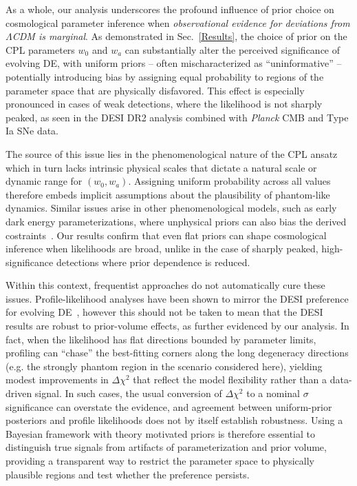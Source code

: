 \documentclass[floats,floatfix,showpacs,amssymb,prd,twocolumn,superscriptaddress,nofootinbib,reprint,preprintnumbers]{revtex4-2}
\begin{document}
As a whole, our analysis underscores the profound influence of prior choice on cosmological parameter inference when \textit{observational evidence for deviations from $\Lambda$CDM is marginal}. As demonstrated in Sec.~\ref{Results}, the choice of prior on the CPL parameters $w_0$ and $w_a$ can substantially  alter the perceived significance of evolving DE, with uniform priors -- often mischaracterized as ``uninformative'' -- potentially introducing bias by assigning equal probability to regions of the parameter space that are physically disfavored. This effect is especially pronounced in cases of weak detections, where the likelihood is not sharply peaked, as seen in the DESI DR2 analysis combined with \textit{Planck} CMB and Type Ia SNe data.

The source of this issue lies in the phenomenological nature of the CPL ansatz 
which in turn lacks intrinsic physical scales that dictate a natural scale or dynamic range  for $(w_0,w_a)$. Assigning uniform probability across all values  
therefore embeds implicit assumptions 
about the plausibility of phantom-like dynamics. Similar issues arise in other phenomenological models, such as early dark energy parameterizations, where unphysical priors can also bias the derived costraints~\cite{Toomey:2024ita}. Our results confirm that even flat priors 
can shape cosmological inference when likelihoods are broad, unlike in the case of sharply peaked, high-significance detections where prior dependence is reduced.  


Within this context, frequentist approaches do not automatically cure these issues.
Profile-likelihood analyses have been shown to mirror the DESI preference for evolving DE~\cite{Herold:2025hkb}, however this should not be taken to mean that the DESI results are robust to prior-volume effects, as further evidenced by our analysis. In fact, when the likelihood has flat directions bounded by parameter limits, profiling can ``chase'' the best-fitting corners along the long degeneracy directions (e.g. the strongly phantom region in the scenario considered here), yielding modest improvements in $\Delta\chi^2$ that reflect the model flexibility rather than a data-driven signal. In such cases, the usual conversion of 
$\Delta\chi^2$ to a nominal $\sigma$ significance can overstate the evidence, and agreement between uniform-prior posteriors and profile likelihoods does not by itself establish robustness. Using a Bayesian framework with theory motivated priors is therefore essential to distinguish true signals from artifacts of parameterization and prior volume, providing a transparent way to restrict the parameter space to physically plausible regions and test whether the preference persists.
\end{document}
